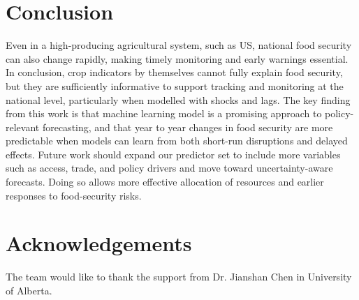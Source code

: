 \documentclass[10pt,twocolumn,letterpaper]{article}
\begin{document}
\section{Conclusion}
Even in a high-producing agricultural system, such as US, national food security can also change rapidly, making timely monitoring and early warnings essential. In conclusion, crop indicators by themselves cannot fully explain food security, but they are sufficiently informative to support tracking and monitoring at the national level, particularly when modelled with shocks and lags. The key finding from this work is that machine learning model is a promising approach to policy-relevant forecasting, and that year to year changes in food security are more predictable when models can learn from both short-run disruptions and delayed effects. Future work should expand our predictor set to include more variables such as access, trade, and policy drivers and move toward uncertainty-aware forecasts. Doing so allows more effective allocation of resources and earlier responses to food-security risks. 

\nocite{*}

\section*{Acknowledgements}
The team would like to thank the support from Dr. Jianshan Chen in University of Alberta. 


\end{document}

